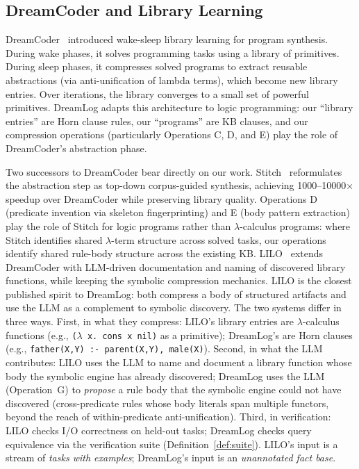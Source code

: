 \documentclass[10pt,conference]{IEEEtran}
\begin{document}
\subsection{DreamCoder and Library Learning}

DreamCoder~\cite{ellis2021dreamcoder,ellis2023dreamcoder} introduced wake-sleep library learning for program synthesis. During wake phases, it solves programming tasks using a library of primitives. During sleep phases, it compresses solved programs to extract reusable abstractions (via anti-unification of lambda terms), which become new library entries. Over iterations, the library converges to a small set of powerful primitives. DreamLog adapts this architecture to logic programming: our ``library entries'' are Horn clause rules, our ``programs'' are KB clauses, and our compression operations (particularly Operations C, D, and E) play the role of DreamCoder's abstraction phase.

Two successors to DreamCoder bear directly on our work. Stitch~\cite{bowers2023stitch} reformulates the abstraction step as top-down corpus-guided synthesis, achieving 1000--10000$\times$ speedup over DreamCoder while preserving library quality. Operations D (predicate invention via skeleton fingerprinting) and E (body pattern extraction) play the role of Stitch for logic programs rather than $\lambda$-calculus programs: where Stitch identifies shared $\lambda$-term structure across solved tasks, our operations identify shared rule-body structure across the existing KB. LILO~\cite{grand2024lilo} extends DreamCoder with LLM-driven documentation and naming of discovered library functions, while keeping the symbolic compression mechanics. LILO is the closest published spirit to DreamLog: both compress a body of structured artifacts and use the LLM as a complement to symbolic discovery. The two systems differ in three ways. First, in what they compress: LILO's library entries are $\lambda$-calculus functions (e.g., \texttt{(}$\lambda$\texttt{ x. cons x nil)} as a primitive); DreamLog's are Horn clauses (e.g., \texttt{father(X,Y) :- parent(X,Y), male(X)}). Second, in what the LLM contributes: LILO uses the LLM to name and document a library function whose body the symbolic engine has already discovered; DreamLog uses the LLM (Operation~G) to \emph{propose} a rule body that the symbolic engine could not have discovered (cross-predicate rules whose body literals span multiple functors, beyond the reach of within-predicate anti-unification). Third, in verification: LILO checks I/O correctness on held-out tasks; DreamLog checks query equivalence via the verification suite (Definition~\ref{def:suite}). LILO's input is a stream of \emph{tasks with examples}; DreamLog's input is an \emph{unannotated fact base}.
\end{document}
